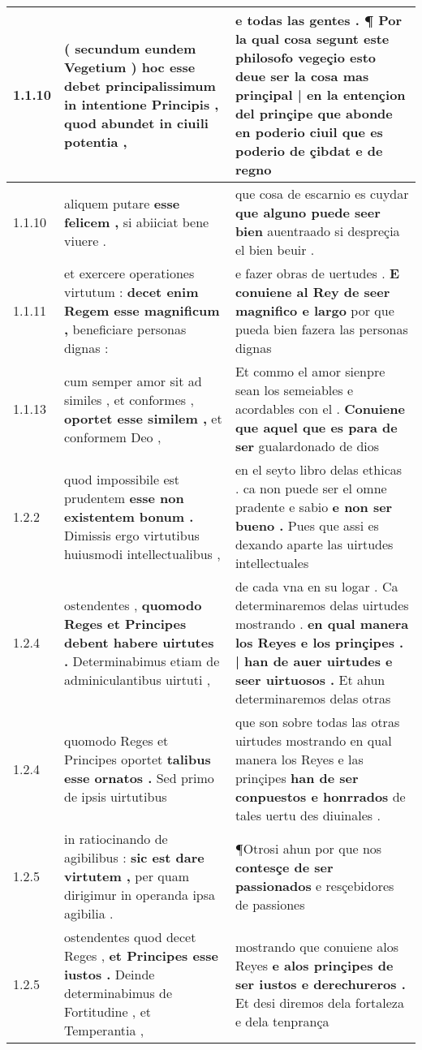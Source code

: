 \begin{tabular}{|p{1cm}|p{6.5cm}|p{6.5cm}|}
1.1.10 & ( secundum eundem Vegetium ) \textbf{ hoc esse debet principalissimum in intentione Principis , } quod abundet in ciuili potentia , & e todas las gentes . \textbf{ ¶ Por la qual cosa segunt este philosofo vegeçio esto deue ser la cosa mas prinçipal | en la entençion del prinçipe } que abonde en poderio ciuil que es poderio de çibdat e de regno \\\hline
1.1.10 & aliquem putare \textbf{ esse felicem , } si abiiciat bene viuere . & que cosa de escarnio es cuydar \textbf{ que alguno puede seer bien } auentraado si despreçia el bien beuir . \\\hline
1.1.11 & et exercere operationes virtutum : \textbf{ decet enim Regem esse magnificum , } beneficiare personas dignas : & e fazer obras de uertudes . \textbf{ E conuiene al Rey de seer magnifico e largo } por que pueda bien fazera las personas dignas \\\hline
1.1.13 & cum semper amor sit ad similes , et conformes , \textbf{ oportet esse similem , } et conformem Deo , & Et commo el amor sienpre sean los semeiables e acordables con el . \textbf{ Conuiene que aquel que es para de ser } gualardonado de dios \\\hline
1.2.2 & quod impossibile est prudentem \textbf{ esse non existentem bonum . } Dimissis ergo virtutibus huiusmodi intellectualibus , & en el seyto libro delas ethicas . ca non puede ser el omne pradente e sabio \textbf{ e non ser bueno . } Pues que assi es dexando aparte las uirtudes intellectuales \\\hline
1.2.4 & ostendentes , \textbf{ quomodo Reges et Principes debent habere uirtutes . } Determinabimus etiam de adminiculantibus uirtuti , & de cada vna en su logar . Ca determinaremos delas uirtudes mostrando . \textbf{ en qual manera los Reyes e los prinçipes . | han de auer uirtudes e seer uirtuosos . } Et ahun determinaremos delas otras \\\hline
1.2.4 & quomodo Reges et Principes oportet \textbf{ talibus esse ornatos . } Sed primo de ipsis uirtutibus & que son sobre todas las otras uirtudes mostrando en qual manera los Reyes e las prinçipes \textbf{ han de ser conpuestos e honrrados } de tales uertu des diuinales . \\\hline
1.2.5 & in ratiocinando de agibilibus : \textbf{ sic est dare virtutem , } per quam dirigimur in operanda ipsa agibilia . & ¶Otrosi ahun por que nos \textbf{ contesçe de ser passionados } e resçebidores de passiones \\\hline
1.2.5 & ostendentes quod decet Reges , \textbf{ et Principes esse iustos . } Deinde determinabimus de Fortitudine , et Temperantia , & mostrando que conuiene alos Reyes \textbf{ e alos prinçipes de ser iustos e derechureros . } Et desi diremos dela fortaleza e dela tenprança \\\hline

\end{tabular}
